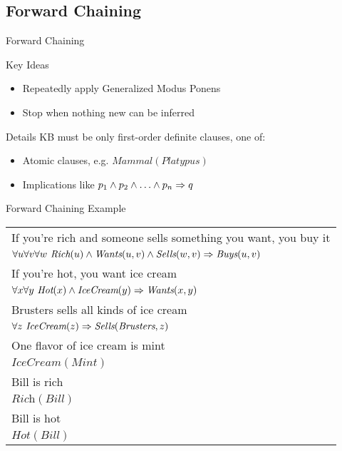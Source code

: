 \documentclass[14pt]{beamer}
\begin{document}
\subsection{Forward Chaining}

\begin{frame}{Forward Chaining}
	\begin{block}{Key Ideas}
		\begin{itemize}
			\item Repeatedly apply Generalized Modus Ponens
			\item Stop when nothing new can be inferred
		\end{itemize}
	\end{block}
	\pause
	\begin{block}{Details}
		KB must be only \alert{first-order definite clauses}, one of:
		\begin{itemize}
			\item Atomic clauses, e.g. $\textit{Mammal}(\textit{Platypus})$
			\item Implications like $p_1 \land p_2 \land \ldots \land p_n \Rightarrow q$
		\end{itemize}
	\end{block}
\end{frame}

\begin{frame}{Forward Chaining Example}
\small
	\begin{tabular}{p{}}
		If you're rich and someone sells something you want, you buy it \\
		\tab$\forall u \forall v \forall w\ \textit{Rich}(u) \land \textit{Wants}(u, v) \land \textit{Sells}(w, v) \Rightarrow \textit{Buys}(u, v)$ \\
		If you're hot, you want ice cream \\
		\tab$\forall x \forall y\ \textit{Hot}(x) \land \textit{IceCream}(y) \Rightarrow \textit{Wants}(x, y)$ \\
		Brusters sells all kinds of ice cream \\
		\tab$\forall z\ \textit{IceCream}(z) \limpl \textit{Sells}(\textit{Brusters}, z)$ \\
		One flavor of ice cream is mint \\
		\tab$\textit{IceCream}(\textit{Mint})$ \\
		Bill is rich \\
		\tab$\textit{Rich}(\textit{Bill})$ \\
		Bill is hot \\
		\tab$\textit{Hot}(\textit{Bill})$
	\end{tabular}
\end{frame}
\end{document}
